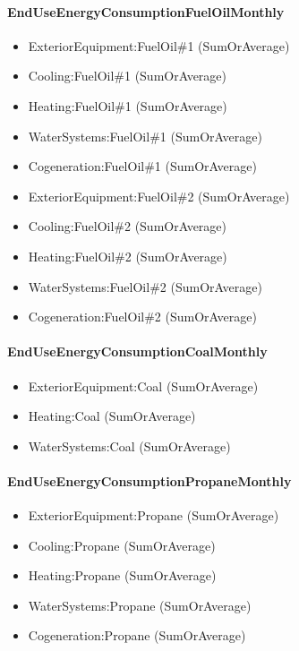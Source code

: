 \paragraph{EndUseEnergyConsumptionFuelOilMonthly}\label{enduseenergyconsumptionfueloilmonthly}

\begin{itemize}
\item
  ExteriorEquipment:FuelOil\#1 (SumOrAverage)
\item
  Cooling:FuelOil\#1 (SumOrAverage)
\item
  Heating:FuelOil\#1 (SumOrAverage)
\item
  WaterSystems:FuelOil\#1 (SumOrAverage)
\item
  Cogeneration:FuelOil\#1 (SumOrAverage)
\item
  ExteriorEquipment:FuelOil\#2 (SumOrAverage)
\item
  Cooling:FuelOil\#2 (SumOrAverage)
\item
  Heating:FuelOil\#2 (SumOrAverage)
\item
  WaterSystems:FuelOil\#2 (SumOrAverage)
\item
  Cogeneration:FuelOil\#2 (SumOrAverage)
\end{itemize}

\paragraph{EndUseEnergyConsumptionCoalMonthly}\label{enduseenergyconsumptioncoalmonthly}

\begin{itemize}
\item
  ExteriorEquipment:Coal (SumOrAverage)
\item
  Heating:Coal (SumOrAverage)
\item
  WaterSystems:Coal (SumOrAverage)
\end{itemize}

\paragraph{EndUseEnergyConsumptionPropaneMonthly}\label{enduseenergyconsumptionpropanemonthly}

\begin{itemize}
\item
  ExteriorEquipment:Propane (SumOrAverage)
\item
  Cooling:Propane (SumOrAverage)
\item
  Heating:Propane (SumOrAverage)
\item
  WaterSystems:Propane (SumOrAverage)
\item
  Cogeneration:Propane (SumOrAverage)
\end{itemize}

